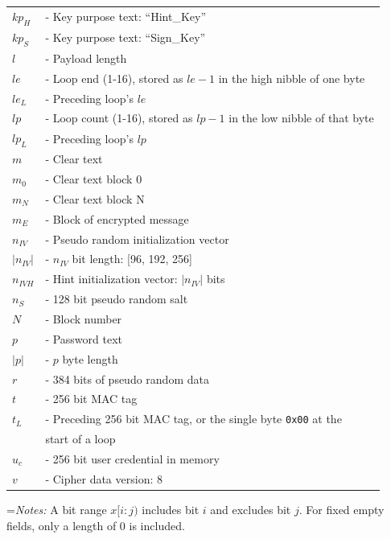 \documentclass{article}
\newlength{\stanzagap}
\newlength{\notegap}
\newlength{\stanzawidth}
\newlength{\stanzabox}
\newenvironment{stanza}[1][\stanzawidth]
  {\par\addvspace{\stanzagap}%
   \setlength{\stanzabox}{\dimexpr\linewidth-\parindent\relax}%
   \ifdim\stanzabox>#1\setlength{\stanzabox}{#1}\fi
   \noindent\hspace*{\parindent}\begin{minipage}{\stanzabox}}
  {\end{minipage}\par\addvspace{\stanzagap}}
\begin{document}
\begin{stanza}
\begin{tabular}{@{}p{5mm} l}
$\mathit{kp}_H$ & \textrm{ - Key purpose text: ``Hint\_Key''}\\
$\mathit{kp}_S$ & \textrm{ - Key purpose text: ``Sign\_Key''}\\
$l$ & \textrm{ - Payload length}\\
$\mathit{le}$ & \textrm{ - Loop end (1-16), stored as }$\mathit{le}-1$\textrm{ in the high nibble of one byte}\\
$\mathit{le}_L$ & \textrm{ - Preceding loop's }$\mathit{le}$\\
$\mathit{lp}$ & \textrm{ - Loop count (1-16), stored as }$\mathit{lp}-1$\textrm{ in the low nibble of that byte}\\
$\mathit{lp}_L$ & \textrm{ - Preceding loop's }$\mathit{lp}$\\
$m$ & \textrm{ - Clear text}\\
$m_0$ & \textrm{ - Clear text block 0}\\
$m_N$ & \textrm{ - Clear text block N}\\
$m_E$ & \textrm{ - Block of encrypted message}\\
$n_{\mathit{IV}}$ & \textrm{ - Pseudo random initialization vector}\\
$|n_{\mathit{IV}}|$ & \textrm{ - }$n_{\mathit{IV}}$\textrm{ bit length: [96, 192, 256]}\\
$n_{\mathit{IVH}}$ & \textrm{ - Hint initialization vector: }$|n_{\mathit{IV}}|$\textrm{ bits}\\
$n_S$ & \textrm{ - 128 bit pseudo random salt}\\
$N$ & \textrm{ - Block number}\\
$p$ & \textrm{ - Password text}\\
$|p|$ & \textrm{ - }$p$\textrm{ byte length}\\
$r$ & \textrm{ - 384 bits of pseudo random data}\\
$t$ & \textrm{ - 256 bit MAC tag}\\
$t_L$ & \textrm{ - Preceding 256 bit MAC tag, or the single byte }\texttt{0x00}\textrm{ at the}\\
& \phantom{\textrm{ - }}\textrm{start of a loop}\\
$u_c$ & \textrm{ - 256 bit user credential in memory}\\
$v$ & \textrm{ - Cipher data version: 8}\\
\end{tabular}

\vspace{\notegap}

{\leftskip=\parindent\noindent\textit{Notes:} A bit range $x[i:j)$ includes bit $i$ and excludes bit $j$. For fixed empty fields, only a length of 0 is included.\par}


\end{stanza}
\end{document}

